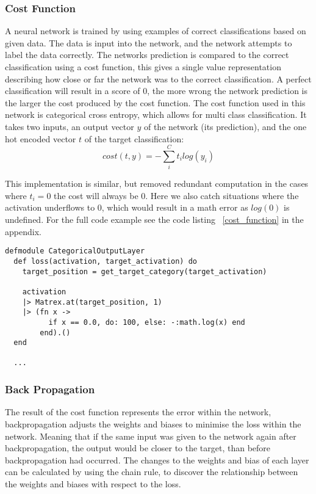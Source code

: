 \subsubsection{Cost Function}
A neural network is trained by using examples of correct classifications based
on given data. The data is input into the network, and the network attempts to
label the data correctly. The networks prediction is compared to the correct
classification using a cost function, this gives a single value representation
describing how close or far the network was to the correct classification. A
perfect classification will result in a score of 0, the more wrong the network
prediction is the larger the cost produced by the cost function. The cost 
function used in this network is categorical cross entropy, which allows for
multi class classification. It takes two inputs, an output vector \(y\) of the network
(its prediction), and the one hot encoded vector \(t\) of the target classification:
\begin{equation}
    cost(t, y) = - \sum_{i}^{C} t_{i}log(y_{i})
\end{equation}

This implementation is similar, but removed redundant computation in the cases
where \(t_{i} = 0\) the cost will always be 0. Here we also catch situations
where the activation underflows to 0, which would result in a math error as
\(log(0)\) is undefined. For the full code example see the code listing
~\ref{cost_function} in the appendix.
\begin{lstlisting}
defmodule CategoricalOutputLayer
  def loss(activation, target_activation) do
    target_position = get_target_category(target_activation)

    activation
    |> Matrex.at(target_position, 1)
    |> (fn x ->
          if x == 0.0, do: 100, else: -:math.log(x) end
        end).()
  end

  ...
\end{lstlisting}


\subsubsection{Back Propagation}
The result of the cost function represents the error within the network,
backpropagation adjusts the weights and biases to minimise the loss within the
network. Meaning that if the same input was given to the network again after
backpropagation, the output would be closer to the target, than before
backpropagation had occurred. The changes to the weights and bias of each layer
can be calculated by using the chain rule, to discover the relationship between
the weights and biases with respect to the loss.

